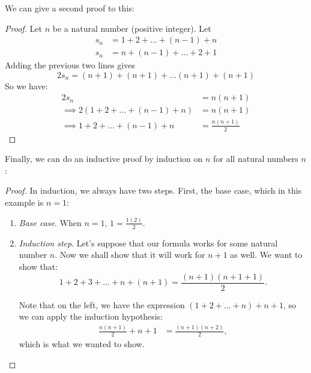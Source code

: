 We can give a second proof to this:
\begin{proof}
Let $n$ be a natural number (positive integer). Let 
\begin{align*}
  s_n &= 1+2+ \dots +(n-1)+n \\
  s_n &= n+ (n-1) +\dots + 2+1
\end{align*}
Adding the previous two lines gives
\[2s_n  = (n+1)+(n+1)+\dots (n+1)+(n+1)\]
So we have:
\begin{align*}
    2s_n &= n(n+1)\\
    \implies 2(1+2+\dots +(n-1)+n) &= n(n+1)
    \\
    \implies 1+2+\dots +(n-1)+n &= \frac{n(n+1)}{2}
\end{align*}

\end{proof}

Finally, we can do an inductive proof by induction on $n$ for all natural numbers $n$:
\begin{proof}
In induction, we always have two steps. First, the base case, which in this example is $n =1$:
\begin{enumerate}
    \item \textit{Base case}. When $n = 1$, $1 = \frac{1(2)}{2}$.
    \item \textit{Induction step}. Let's suppose that our formula works for some natural number $n$. Now we shall show that it will work for $n+1$ as well. We want to show that:
    \[
    1 + 2 + 3 + \dots + n + (n+1) = \frac{(n+1)(n+1+1)}{2}.
    \]
    
    Note that on the left, we have the expression $(1 + 2 + \dots + n) + n+1$, so we can apply the induction hypothesis:
    \begin{align*}
        \frac{n(n+1)}{2} + n+1 &= \frac{(n+1)(n+2)}{2},
    \end{align*}
    which is what we wanted to show.
\end{enumerate}
\end{proof}


